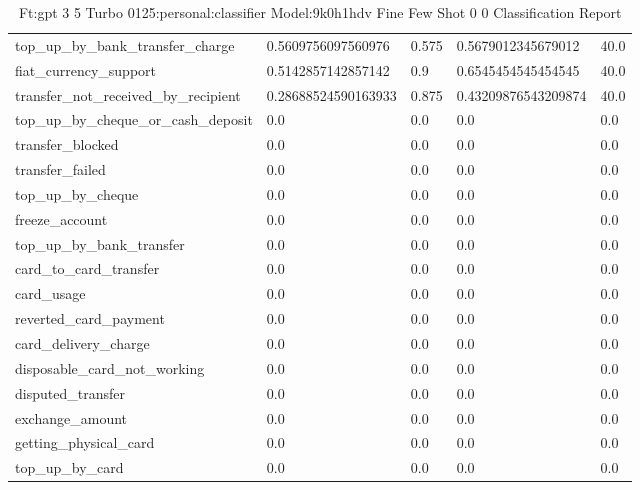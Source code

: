 \begin{table}[!ht]
\begin{tabularx}{\textwidth}{X l l l l}
top\_up\_by\_bank\_transfer\_charge & \num{0.5609756097560976} & \num{0.575} & \num{0.5679012345679012} & \num{40.0} \\
fiat\_currency\_support & \num{0.5142857142857142} & \num{0.9} & \num{0.6545454545454545} & \num{40.0} \\
transfer\_not\_received\_by\_recipient & \num{0.28688524590163933} & \num{0.875} & \num{0.43209876543209874} & \num{40.0} \\
top\_up\_by\_cheque\_or\_cash\_deposit & \num{0.0} & \num{0.0} & \num{0.0} & \num{0.0} \\
transfer\_blocked & \num{0.0} & \num{0.0} & \num{0.0} & \num{0.0} \\
transfer\_failed & \num{0.0} & \num{0.0} & \num{0.0} & \num{0.0} \\
top\_up\_by\_cheque & \num{0.0} & \num{0.0} & \num{0.0} & \num{0.0} \\
freeze\_account & \num{0.0} & \num{0.0} & \num{0.0} & \num{0.0} \\
top\_up\_by\_bank\_transfer & \num{0.0} & \num{0.0} & \num{0.0} & \num{0.0} \\
card\_to\_card\_transfer & \num{0.0} & \num{0.0} & \num{0.0} & \num{0.0} \\
card\_usage & \num{0.0} & \num{0.0} & \num{0.0} & \num{0.0} \\
reverted\_card\_payment & \num{0.0} & \num{0.0} & \num{0.0} & \num{0.0} \\
card\_delivery\_charge & \num{0.0} & \num{0.0} & \num{0.0} & \num{0.0} \\
disposable\_card\_not\_working & \num{0.0} & \num{0.0} & \num{0.0} & \num{0.0} \\
disputed\_transfer & \num{0.0} & \num{0.0} & \num{0.0} & \num{0.0} \\
exchange\_amount & \num{0.0} & \num{0.0} & \num{0.0} & \num{0.0} \\
getting\_physical\_card & \num{0.0} & \num{0.0} & \num{0.0} & \num{0.0} \\
top\_up\_by\_card & \num{0.0} & \num{0.0} & \num{0.0} & \num{0.0} \\
\bottomrule
\end{tabularx}

        \caption{Ft:gpt 3 5 Turbo 0125:personal:classifier Model:9k0h1hdv Fine Few Shot 0 0 Classification Report}
        \label{tab:ft:gpt-3-5-turbo-0125:personal:classifier-model:9k0H1hdV-fine-few-shot-0-0-classification-report}
    \end{table}
    